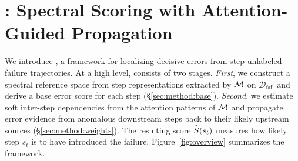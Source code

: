 








\section{\soap: Spectral Scoring with Attention-Guided Propagation}
\label{sec:method}


We introduce \soap, a framework for localizing decisive errors from
step-unlabeled failure trajectories.
At a high level, \soap consists of two stages.
\textit{First}, we construct a spectral reference space from step
representations extracted by $\mathcal{M}$ on $\mathcal{D}_{\mathrm{fail}}$ and
derive a base error score for each step
(\S\ref{sec:method:base}).
\textit{Second}, we estimate soft inter-step dependencies from the attention
patterns of $\mathcal{M}$ and propagate error evidence from anomalous downstream
steps back to their likely upstream sources
(\S\ref{sec:method:weights}).
The resulting score $\widetilde{S}(s_t)$ measures how likely step $s_t$ is to have
introduced the failure.
Figure~\ref{fig:overview} summarizes the framework.



